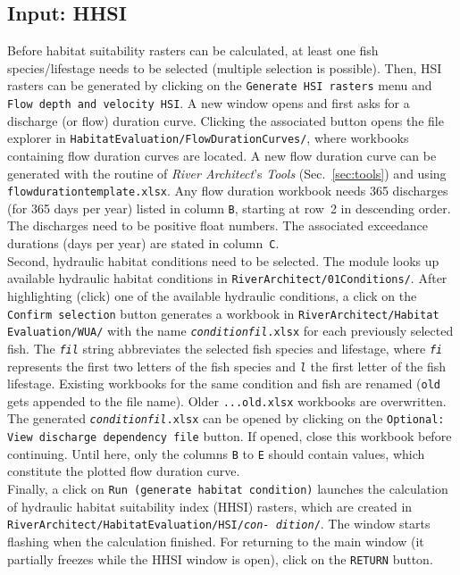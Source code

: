 \subsection{Input: HHSI} \label{sec:hemakehsi}
Before habitat suitability rasters can be calculated, at least one fish species/lifestage needs to be selected (multiple selection is possible). Then, HSI rasters can be generated by clicking on the \texttt{Generate HSI rasters} menu and \texttt{Flow depth and velocity HSI}. A new window opens and first asks for a discharge (or flow) duration curve. Clicking the associated button opens the file explorer in \texttt{HabitatEvaluation/FlowDurationCurves/}, where workbooks containing flow duration curves are located. A new flow duration curve can be generated with the  routine of \textit{River Architect}'s \textit{Tools} (Sec.~\ref{sec:tools}) and using \texttt{flow{\myUnderscore}duration{\myUnderscore}template.xlsx}. Any flow duration workbook needs 365 discharges (for 365 days per year) listed in column \texttt{B}, starting at row~2 in descending order. The discharges need to be positive float numbers. The associated exceedance durations (days per year) are stated in column~\texttt{C}.\\
Second, hydraulic habitat conditions need to be selected. The module looks up available hydraulic habitat conditions in \texttt{RiverArchitect/01{\myUnderscore}Conditions/}. After highlighting (click) one of the available hydraulic conditions, a click on the \texttt{Confirm selection} button generates a workbook in \texttt{RiverArchitect/Habitat Evaluation/WUA/} with the name \texttt{\textit{condition}{\myUnderscore}\textit{fil}.xlsx} for each previously selected fish. The \texttt{\textit{fil}} string abbreviates the selected fish species and lifestage, where \texttt{\textit{fi}} represents the first two letters of the fish species and \texttt{\textit{l}} the first letter of the fish lifestage. Existing workbooks for the same condition and fish are renamed (\texttt{{\myUnderscore}old} gets appended to the file name). Older \texttt{...{\myUnderscore}old.xlsx} workbooks are overwritten.\\
The generated \texttt{\textit{condition}{\myUnderscore}\textit{fil}.xlsx} can be opened by clicking on the \texttt{Optional: View discharge dependency file} button. If opened, close this workbook before continuing. Until here, only the columns \texttt{B} to \texttt{E} should contain values, which constitute the plotted flow duration curve.\\
Finally, a click on \texttt{Run (generate habitat condition)} launches the calculation of hydraulic habitat suitability index (HHSI) rasters, which are created in \texttt{RiverArchitect/HabitatEvaluation/HSI/\textit{con- dition}/}. The window starts flashing when the calculation finished. For returning to the main window (it partially freezes while the HHSI window is open), click on the \texttt{RETURN} button.

